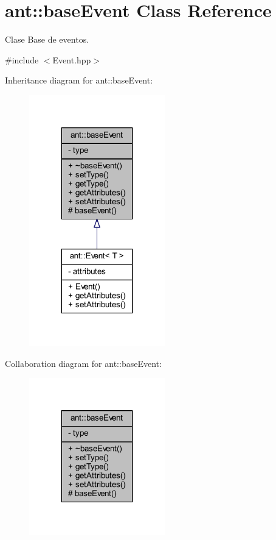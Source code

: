 \hypertarget{classant_1_1base_event}{\section{ant\+:\+:base\+Event Class Reference}
\label{classant_1_1base_event}
}


Clase Base de eventos.  




{\ttfamily \#include $<$Event.\+hpp$>$}



Inheritance diagram for ant\+:\+:base\+Event\+:
\nopagebreak
\begin{figure}[H]
\begin{center}
\leavevmode
\includegraphics[width=167pt]{d6/d46/classant_1_1base_event__inherit__graph}
\end{center}
\end{figure}


Collaboration diagram for ant\+:\+:base\+Event\+:
\nopagebreak
\begin{figure}[H]
\begin{center}
\leavevmode
\includegraphics[width=167pt]{de/d86/classant_1_1base_event__coll__graph}
\end{center}
\end{figure}
